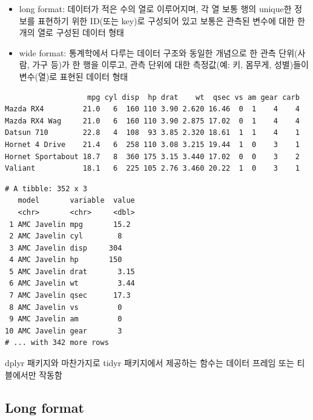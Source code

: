 \documentclass[
  11pt,
]{krantz}
\makeatletter
\providecommand{\tightlist}{%
  \setlength{\itemsep}{0pt}\setlength{\parskip}{0pt}}
\newenvironment{kframe}{%
\medskip{}
\setlength{\fboxsep}{.8em}
 \def\at@end@of@kframe{}%
 \ifinner\ifhmode%
  \def\at@end@of@kframe{\end{minipage}}%
  \begin{minipage}{\columnwidth}%
 \fi\fi%
 \def\FrameCommand##1{\hskip\@totalleftmargin \hskip-\fboxsep
 \colorbox{shadecolor}{##1}\hskip-\fboxsep
     \hskip-\linewidth \hskip-\@totalleftmargin \hskip\columnwidth}%
 \MakeFramed {\advance\hsize-\width
   \@totalleftmargin\z@ \linewidth\hsize
   \@setminipage}}%
 {\par\unskip\endMakeFramed%
 \at@end@of@kframe}
\renewenvironment{quote}{\begin{kframe}}{\end{kframe}}
\let\BeginKnitrBlock\begin \let\EndKnitrBlock\end
\makeatother
\begin{document}
\normalsize

\begin{quote}
\begin{itemize}
\tightlist
\item
  long format: 데이터가 적은 수의 열로 이루어지며, 각 열 보통 행의 unique한 정보를 표현하기 위한 ID(또는 key)로 구성되어 있고 보통은 관측된 변수에 대한 한 개의 열로 구성된 데이터 형태
\item
  wide format: 통계학에서 다루는 데이터 구조와 동일한 개념으로 한 관측 단위(사람, 가구 등)가 한 행을 이루고, 관측 단위에 대한 측정값(예: 키, 몸무게, 성별)들이 변수(열)로 표현된 데이터 형태
\end{itemize}
\end{quote}

\footnotesize

\begin{verbatim}
                   mpg cyl disp  hp drat    wt  qsec vs am gear carb
Mazda RX4         21.0   6  160 110 3.90 2.620 16.46  0  1    4    4
Mazda RX4 Wag     21.0   6  160 110 3.90 2.875 17.02  0  1    4    4
Datsun 710        22.8   4  108  93 3.85 2.320 18.61  1  1    4    1
Hornet 4 Drive    21.4   6  258 110 3.08 3.215 19.44  1  0    3    1
Hornet Sportabout 18.7   8  360 175 3.15 3.440 17.02  0  0    3    2
Valiant           18.1   6  225 105 2.76 3.460 20.22  1  0    3    1
\end{verbatim}

\begin{verbatim}
# A tibble: 352 x 3
   model       variable  value
   <chr>       <chr>     <dbl>
 1 AMC Javelin mpg       15.2 
 2 AMC Javelin cyl        8   
 3 AMC Javelin disp     304   
 4 AMC Javelin hp       150   
 5 AMC Javelin drat       3.15
 6 AMC Javelin wt         3.44
 7 AMC Javelin qsec      17.3 
 8 AMC Javelin vs         0   
 9 AMC Javelin am         0   
10 AMC Javelin gear       3   
# ... with 342 more rows
\end{verbatim}

\normalsize

\footnotesize

\BeginKnitrBlock{rmdcaution}
dplyr 패키지와 마찬가지로 tidyr 패키지에서 제공하는 함수는 데이터 프레임 또는 티블에서만 작동함
\EndKnitrBlock{rmdcaution}

\normalsize

\hypertarget{long-format}{%
\subsection{Long format}\label{long-format}}
\end{document}
